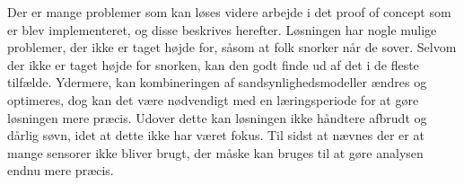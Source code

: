 Der er mange problemer som kan løses videre arbejde i det proof of concept som er blev implementeret, og disse beskrives herefter.
Løsningen har nogle mulige problemer, der ikke er taget højde for, såsom at folk snorker når de sover.
Selvom der ikke er taget højde for snorken, kan den godt finde ud af det i de fleste tilfælde.
Ydermere, kan kombineringen af sandsynlighedsmodeller ændres og optimeres, dog kan det være nødvendigt med en læringsperiode for at gøre løsningen mere præcis.
Udover dette kan løsningen ikke håndtere afbrudt og dårlig søvn, idet at dette ikke har været fokus.
Til sidst at nævnes der er at mange sensorer ikke bliver brugt, der måske kan bruges til at gøre analysen endnu mere præcis.